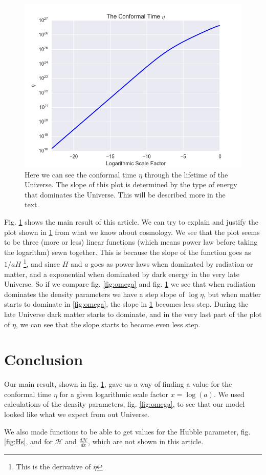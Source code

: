 \documentclass[a4paper,norsk, 10pt]{article}
\begin{document}
\begin{figure}[H]
     \centering
	{\includegraphics[scale=0.5]{eta.png}
	\caption{Here we can see the conformal time $\eta$ through the lifetime of the Universe. The slope of this plot is determined by the type of energy that dominates the Universe. This will be described more in the text. }\label{fig:eta}}
\end{figure}


Fig. \ref{fig:eta} shows the main result of this article. We can try to explain and justify the plot shown in \ref{fig:eta} from what we know about cosmology. We see that the plot seems to be three (more or less) linear functions (which means power law before taking the logarithm) sewn together. This is because the slope of the function goes as $1/aH$ \footnote{This is the derivative of $\eta$}, and since $H$ and $a$ goes as power laws when dominated by radiation or matter, and a exponential when dominated by dark energy in the very late Universe. So if we compare fig. \ref{fig:omega} and fig. \ref{fig:eta} we see that when radiation dominates the density parameters we have a step slope of $\log \eta$, but when matter starts to dominate in \ref{fig:omega}, the slope in \ref{fig:eta} becomes less step. During the late Universe dark matter starts to dominate, and in the very last part of the plot of $\eta$, we can see that the slope starts to become even less step. 


\section{Conclusion}

Our main result, shown in fig. \ref{fig:eta}, gave us a way of finding a value for the conformal time $\eta$ for a given logarithmic scale factor $x = \log(a)$. We used calculations of the density parameters, fig. \ref{fig:omega}, to see that our model looked like what we expect from out Universe. 

We also made functions to be able to get values for the Hubble parameter, fig. \ref{fig:Hs}, and for $\mathcal{H}$ and $\frac{d\mathcal{H}}{dx}$, which are not shown in this article.
\end{document}
